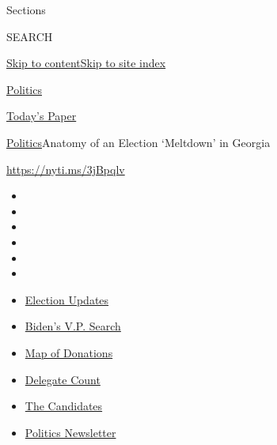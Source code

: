 Sections

SEARCH

\protect\hyperlink{site-content}{Skip to
content}\protect\hyperlink{site-index}{Skip to site index}

\href{https://www.nytimes3xbfgragh.onion/section/politics}{Politics}

\href{https://myaccount.nytimes3xbfgragh.onion/auth/login?response_type=cookie\&client_id=vi}{}

\href{https://www.nytimes3xbfgragh.onion/section/todayspaper}{Today's
Paper}

\href{/section/politics}{Politics}\textbar{}Anatomy of an Election
`Meltdown' in Georgia

\url{https://nyti.ms/3jBpqlv}

\begin{itemize}
\item
\item
\item
\item
\item
\item
\end{itemize}

\begin{itemize}
\item
  \href{https://www.nytimes3xbfgragh.onion/2020/08/04/us/elections/primary-election-michigan-arizona-kansas.html?action=click\&pgtype=Article\&state=default\&region=TOP_BANNER\&context=storylines_menu}{Election
  Updates}
\item
  \href{https://www.nytimes3xbfgragh.onion/article/biden-vice-president-2020.html?action=click\&pgtype=Article\&state=default\&region=TOP_BANNER\&context=storylines_menu}{Biden's
  V.P. Search}
\item
  \href{https://www.nytimes3xbfgragh.onion/interactive/2020/07/24/us/politics/trump-biden-campaign-donors.html?action=click\&pgtype=Article\&state=default\&region=TOP_BANNER\&context=storylines_menu}{Map
  of Donations}
\item
  \href{https://www.nytimes3xbfgragh.onion/interactive/2020/us/elections/delegate-count-primary-results.html?action=click\&pgtype=Article\&state=default\&region=TOP_BANNER\&context=storylines_menu}{Delegate
  Count}
\item
  \href{https://www.nytimes3xbfgragh.onion/interactive/2019/us/politics/2020-presidential-candidates.html?action=click\&pgtype=Article\&state=default\&region=TOP_BANNER\&context=storylines_menu}{The
  Candidates}
\item
  \href{https://www.nytimes3xbfgragh.onion/newsletters/politics?action=click\&pgtype=Article\&state=default\&region=TOP_BANNER\&context=storylines_menu}{Politics
  Newsletter}
\end{itemize}

